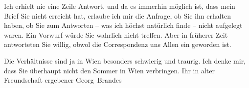 \pstart
           Ich erhielt nie eine Zeile Antwort, und da es immerhin möglich ist, dass mein Brief
               Sie nicht erreicht hat, erlaube ich mir die Anfrage, ob Sie ihn erhalten haben, ob
               Sie zum Antworten – was ich höchst natürlich finde – nicht aufgelegt waren. Ein
               Vorwurf würde Sie wahrlich nicht treffen. Aber in früherer Zeit antworteten Sie
               willig, obwol {\pb}die Correspondenz
               uns Allen ein \label{K_L02354-2v}\label{K_L02354-2} geworden
               ist.\pend
           
\pstart
           Die Verhältnisse sind ja in Wien besonders
               schwierig und traurig. Ich denke mir, dass Sie überhaupt nicht den Sommer in Wien verbringen.\pend
           \pstart Ihr in alter Freundschaft ergebener \spacefill\mbox{Georg Brandes}\pend{}\endnumbering{}  \newcommand{\dateiname}{L02354}\newcommand{\titel}{Georg Brandes an Arthur Schnitzler, 17. 8. 1920}\newcommand{\editorInnen}{Martin Anton Müller und Gerd-Hermann Susen}
